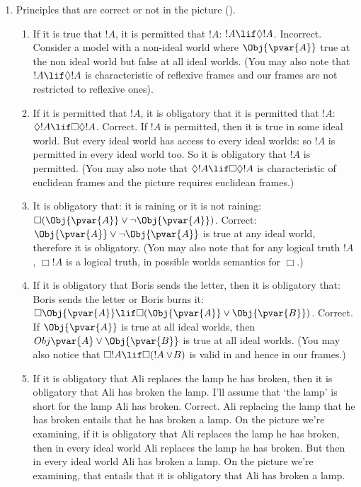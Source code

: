 \documentclass[../../../../include/open-logic-section]{subfiles}
\begin{document}
\begin{prob}
\begin{ans}
\begin{enumerate}
	\item Principles that are correct or not in the picture ().
	\begin{enumerate}
	\item If it is true that $!A$, it is permitted that $!A$: $!A\lif \Diamond !A$.
	Incorrect. Consider a model with a non-ideal world where $\Obj{\pvar{A}}$ true 
	at the non ideal world but false at all ideal worlds. (You may also note 
	that $!A\lif \Diamond !A$ is characteristic of reflexive frames and 
	our frames are not restricted to reflexive ones).
	
	\item If it is permitted that $!A$, it is obligatory that it is permitted
	that $!A$: $\Diamond!A\lif\Box\Diamond !A$. Correct. If $!A$ is 
	permitted, then it is true in some ideal world. But every ideal world
	has access to every ideal worlds: so $!A$ is permitted in every 
	ideal world too. So it is obligatory that $!A$ is permitted. (You 
	may also note that $\Diamond!A\lif\Box\Diamond !A$ is characteristic
	of euclidean frames and the picture requires euclidean frames.)

	\item It is obligatory that: it is raining or it is not raining:
	$\Box(\Obj{\pvar{A}}\lor\lnot\Obj{\pvar{A}})$. Correct: 
	$\Obj{\pvar{A}}\lor\lnot\Obj{\pvar{A}}$
	is true at any ideal world, therefore it is obligatory. (You may 
	also note that for any logical truth $!A$, $\Box!A$ is a logical truth,
	in possible worlds semantics for $\Box$.)

	\item If it is obligatory that Boris sends the letter, then it is obligatory
	that: Boris sends the letter or Boris burns it: 
	$\Box\Obj{\pvar{A}}\lif\Box(\Obj{\pvar{A}}\lor\Obj{\pvar{B}})$.
	Correct. If $\Obj{\pvar{A}}$ is true at all ideal worlds, then 
	$Obj{\pvar{A}}\lor\Obj{\pvar{B}}$ is true at all ideal worlds. 
	(You may also notice that $\Box!A\lif\Box(!A\lor\!B)$ is valid in 
	 and hence in our frames.)

	\item If it is obligatory that Ali replaces the lamp he has broken, then
	it is obligatory that Ali has broken the lamp. I'll assume that `the lamp'
	is short for the lamp Ali has broken. Correct. Ali replacing the 
	lamp that he has broken entails that he has broken a lamp. On the 
	picture we're examining, if it is obligatory that Ali replaces the 
	lamp he has broken, then in every ideal world Ali replaces the 
	lamp he has broken. But then in every ideal world Ali has broken a 
	lamp. On the picture we're examining, that entails that it is 
	obligatory that Ali has broken a lamp. 


\end{enumerate}
\end{enumerate}
\end{ans}
\end{prob}
\end{document}
